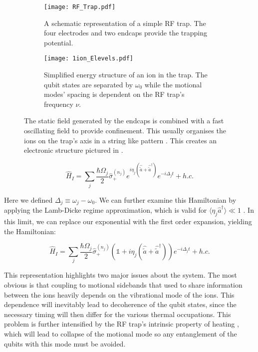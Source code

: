 \documentclass[12pt,twoside]{report}
\begin{document}
\begin{figure}[t!]
	\centering
	\begin{subfigure}[t]{0.4\textwidth}
		\centering
		\texttt{[image: RF\_Trap.pdf]}
		\caption{A schematic representation of a simple RF trap. The four electrodes and two endcaps provide the trapping potential.}
		\label{fig:rftrap:schematic}
	\end{subfigure}
	\hfill
	\begin{subfigure}[t]{0.55\textwidth}
		\centering
		\texttt{[image: 1ion\_Elevels.pdf]}
		\caption{Simplified energy structure of an ion in the trap. The qubit states are separated by $\omega_0$ while the motional modes' spacing is dependent on the RF trap's frequency $\nu$.}
		\label{fig:rftrap:estructure}
	\end{subfigure}
	\caption[RF Trap schematic and energy]{The static field generated by the endcaps is combined with a fast oscillating field to provide confinement. This usually organises the ions on the trap's axis in a string like pattern \cite{RF_Traps,Charged_Particle_traps_Paul}. This creates an electronic structure pictured in .}
	\label{fig:rftrap}
\end{figure}

\begin{equation}
	\hat{H}_I = \sum_{j}\frac{\hbar\Omega_j}{2}\hat{\sigma}^{\left(n_j\right)}_+e^{i\eta_j\left(\hat{\tilde{a}} + \hat{\tilde{a}}^\dagger\right)} e^{-i\Delta_jt} + h.c.
	\label{eq:Interaction_H}
\end{equation}

Here we defined $\Delta_j\equiv\omega_j-\omega_0$. We can further examine this Hamiltonian by applying the Lamb-Dicke regime approximation, which is valid for $\langle\eta_j\hat{a}^\dagger\rangle \ll 1$ \cite{MS_gate}. In this limit, we can replace our exponential with the first order expansion, yielding the Hamiltonian:

\begin{equation}
	\hat{H}_I = \sum_{j}\frac{\hbar\Omega_j}{2}\hat{\sigma}^{\left(n_j\right)}_+\left(\mathds{1} + i\eta_j\left(\hat{\tilde{a}} + \hat{\tilde{a}}^\dagger\right)\right)e^{-i\Delta_jt} + h.c.
	\label{eq:Interaction_H_LD}
\end{equation}

This representation highlights two major issues about the system. The most obvious is that coupling to motional sidebands that used to share information between the ions \cite{QIP_Trapped_ions} heavily depends on the vibrational mode of the ions. This dependence will inevitably lead to decoherence of the qubit states, since the necessary timing will then differ for the various thermal occupations. This problem is further intensified by the RF trap's intrinsic property of heating \cite{QIP_Trapped_ions,RF_Traps}, which will lead to collapse of the motional mode so any entanglement of the qubits with this mode must be avoided.
\end{document}
